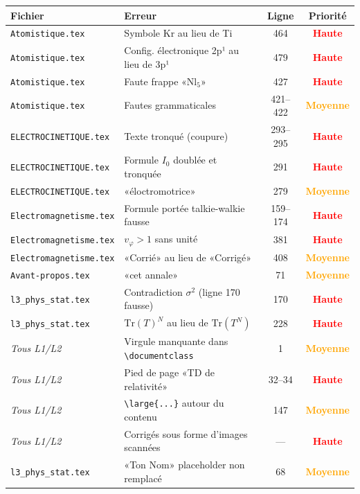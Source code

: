 \documentclass[12pt,a4paper]{article}
\newcommand{\fichier}[1]{\texttt{\small\color{Purple}#1}}
\begin{document}
\begin{center}
\begin{tabularx}{\linewidth}{lXcc}
\toprule
\textbf{Fichier} & \textbf{Erreur} & \textbf{Ligne} & \textbf{Priorité} \\
\midrule
\fichier{Atomistique.tex} & Symbole Kr au lieu de Ti & 464 & \textcolor{red}{\textbf{Haute}} \\
\fichier{Atomistique.tex} & Config. électronique 2p¹ au lieu de 3p¹ & 479 & \textcolor{red}{\textbf{Haute}} \\
\fichier{Atomistique.tex} & Faute frappe «Nl$_5$» & 427 & \textcolor{red}{\textbf{Haute}} \\
\fichier{Atomistique.tex} & Fautes grammaticales & 421--422 & \textcolor{orange}{\textbf{Moyenne}} \\
\fichier{ELECTROCINETIQUE.tex} & Texte tronqué (coupure) & 293--295 & \textcolor{red}{\textbf{Haute}} \\
\fichier{ELECTROCINETIQUE.tex} & Formule $I_0$ doublée et tronquée & 291 & \textcolor{red}{\textbf{Haute}} \\
\fichier{ELECTROCINETIQUE.tex} & «éloctromotrice» & 279 & \textcolor{orange}{\textbf{Moyenne}} \\
\fichier{Electromagnetisme.tex} & Formule portée talkie-walkie fausse & 159--174 & \textcolor{red}{\textbf{Haute}} \\
\fichier{Electromagnetisme.tex} & $v_\varphi > 1$ sans unité & 381 & \textcolor{red}{\textbf{Haute}} \\
\fichier{Electromagnetisme.tex} & «Corrié» au lieu de «Corrigé» & 408 & \textcolor{orange}{\textbf{Moyenne}} \\
\fichier{Avant-propos.tex} & «cet annale» & 71 & \textcolor{orange}{\textbf{Moyenne}} \\
\fichier{l3\_phys\_stat.tex} & Contradiction $\sigma^2$ (ligne 170 fausse) & 170 & \textcolor{red}{\textbf{Haute}} \\
\fichier{l3\_phys\_stat.tex} & $\text{Tr}(T)^N$ au lieu de $\text{Tr}(T^N)$ & 228 & \textcolor{red}{\textbf{Haute}} \\
\textit{Tous L1/L2} & Virgule manquante dans \verb|\documentclass| & 1 & \textcolor{orange}{\textbf{Moyenne}} \\
\textit{Tous L1/L2} & Pied de page «TD de relativité» & 32--34 & \textcolor{red}{\textbf{Haute}} \\
\textit{Tous L1/L2} & \verb|\large{...}| autour du contenu & 147 & \textcolor{orange}{\textbf{Moyenne}} \\
\textit{Tous L1/L2} & Corrigés sous forme d'images scannées & --- & \textcolor{red}{\textbf{Haute}} \\
\fichier{l3\_phys\_stat.tex} & «Ton Nom» placeholder non remplacé & 68 & \textcolor{orange}{\textbf{Moyenne}} \\
\bottomrule
\end{tabularx}
\end{center}
\end{document}
